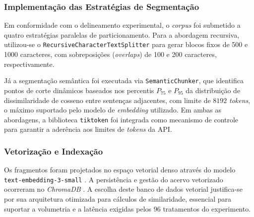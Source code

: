 \subsubsection{Implementação das Estratégias de Segmentação}

Em conformidade com o delineamento experimental, o \textit{corpus} foi submetido a quatro estratégias paralelas de particionamento. Para a abordagem recursiva, utilizou-se o \texttt{RecursiveCharacterTextSplitter} para gerar blocos fixos de 500 e 1000 caracteres, com sobreposições (\textit{overlaps}) de 100 e 200 caracteres, respectivamente.

Já a segmentação semântica foi executada via \texttt{SemanticChunker}, que identifica pontos de corte dinâmicos baseados nos percentis $P_{75}$ e $P_{95}$ da distribuição de dissimilaridade de cosseno entre sentenças adjacentes, com limite de $8192$ \textit{tokens}, o máximo suportado pelo modelo de \textit{embedding} utilizado. Em ambas as abordagens, a biblioteca \texttt{tiktoken} foi integrada como mecanismo de controle para garantir a aderência aos limites de \textit{tokens} da API.


\subsubsection{Vetorização e Indexação}

Os fragmentos foram projetados no espaço vetorial denso através do modelo \texttt{text-embedding-3-small} \citep{openai2024embeddings}. A persistência e gestão do acervo vetorizado ocorreram no \textit{ChromaDB} \citep{chromadb2023}. A escolha deste banco de dados vetorial justifica-se por sua arquitetura otimizada para cálculos de similaridade, essencial para suportar a volumetria e a latência exigidas pelos 96 tratamentos do experimento.
